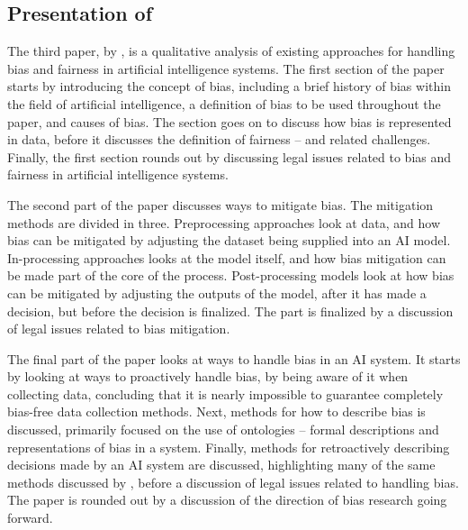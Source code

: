 \subsection[Presentation of Ntoutsi et al. (2020)]{Presentation of \textcite{Ntoutsi_2020}}
The third paper,  by \textcite{Ntoutsi_2020}, is a qualitative analysis of existing approaches for handling bias and fairness in artificial intelligence systems. The first section of the paper starts by introducing the concept of bias, including a brief history of bias within the field of artificial intelligence, a definition of bias to be used throughout the paper, and causes of bias. The section goes on to discuss how bias is represented in data, before it discusses the definition of fairness -- and related challenges. Finally, the first section rounds out by discussing legal issues related to bias and fairness in artificial intelligence systems.

The second part of the paper discusses ways to mitigate bias. The mitigation methods are divided in three. Preprocessing approaches look at data, and how bias can be mitigated by adjusting the dataset being supplied into an AI model. In-processing approaches looks at the model itself, and how bias mitigation can be made part of the core of the process. Post-processing models look at how bias can be mitigated by adjusting the outputs of the model, after it has made a decision, but before the decision is finalized. The part is finalized by a discussion of legal issues related to bias mitigation.

The final part of the paper looks at ways to handle bias in an AI system. It starts by looking at ways to proactively handle bias, by being aware of it when collecting data, concluding that it is nearly impossible to guarantee completely bias-free data collection methods. Next, methods for how to describe bias is discussed,  primarily focused on the use of ontologies -- formal descriptions and representations of bias in a system. Finally, methods for retroactively describing decisions made by an AI system are discussed, highlighting many of the same methods discussed by \textcite{Barredo_2020}, before a discussion of legal issues related to handling bias. The paper is rounded out by a discussion of the direction of bias research going forward.



